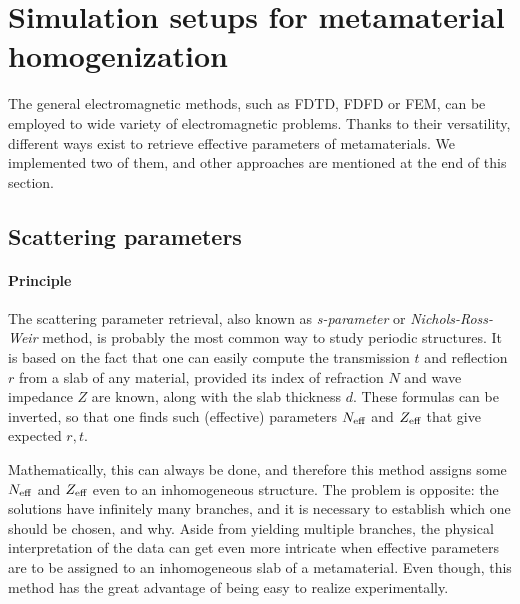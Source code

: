 

\section{Simulation setups for metamaterial homogenization} %
The general electromagnetic methods, such as FDTD, FDFD or FEM, can be employed to wide variety of electromagnetic problems. Thanks to their versatility, different ways exist to retrieve effective parameters of metamaterials. We implemented two of them, and other approaches are mentioned at the end of this section.
\subsection{Scattering parameters} %
\paragraph{Principle} %
The scattering parameter retrieval, also known as \textit{s-parameter} or \textit{Nichols-Ross-Weir} method, is probably the most common way to study periodic structures. It is based on the fact that one can easily compute the transmission $t$ and reflection $r$ from a slab of any material, provided its index of refraction $N$ and wave impedance $Z$ are known, along with the slab thickness $d$. These formulas can be inverted, so that one finds such (effective) parameters $N_{\text{eff} }$ and $Z_{\text{eff} }$ that give expected $r,t$. 

Mathematically, this can always be done, and therefore this method assigns some $N_{\text{eff} }$ and $Z_{\text{eff} }$ even to an inhomogeneous structure. The problem is opposite: the solutions have infinitely many branches, and it is necessary to establish which one should be chosen, and why. Aside from yielding multiple branches, the physical interpretation of the data can get even more intricate when effective parameters are to be assigned to an inhomogeneous slab of a metamaterial. 
Even though, this method has the great advantage of being easy to realize experimentally.

